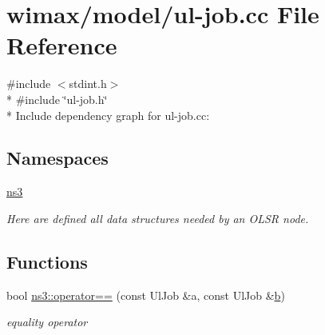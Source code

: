 \hypertarget{ul-job_8cc}{}\section{wimax/model/ul-\/job.cc File Reference}
\label{ul-job_8cc}
{\ttfamily \#include $<$stdint.\+h$>$}\\*
{\ttfamily \#include \char`\"{}ul-\/job.\+h\char`\"{}}\\*
Include dependency graph for ul-\/job.cc\+:
\subsection*{Namespaces}
\begin{DoxyCompactItemize}
\item 
 \hyperlink{namespacens3}{ns3}
\begin{DoxyCompactList}\small\item\em Here are defined all data structures needed by an O\+L\+SR node. \end{DoxyCompactList}\end{DoxyCompactItemize}
\subsection*{Functions}
\begin{DoxyCompactItemize}
\item 
bool \hyperlink{namespacens3_a68e85aac3e80a8b99253bbe02d98de0b}{ns3\+::operator==} (const Ul\+Job \&a, const Ul\+Job \&\hyperlink{lte__pathloss_8m_a21ad0bd836b90d08f4cf640b4c298e7c}{b})
\begin{DoxyCompactList}\small\item\em equality operator \end{DoxyCompactList}\end{DoxyCompactItemize}

